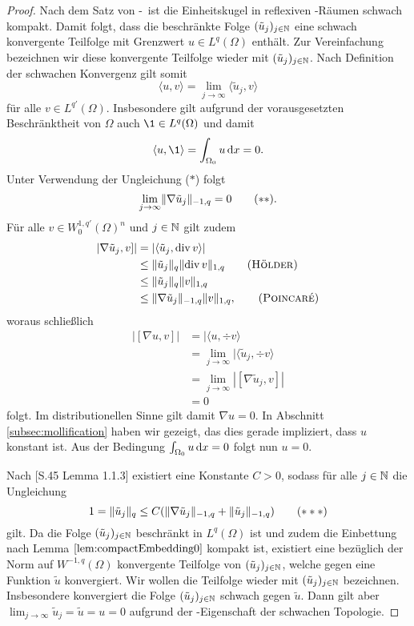 \begin{proof}
  Nach dem Satz von \banach\hyp{}\alaoglu\ ist die Einheitskugel in reflexiven \banach\hyp{}Räumen schwach kompakt.
  Damit folgt, dass die beschränkte Folge $(\tilde u_j)_{j \in \mathbb{N}}$ eine schwach konvergente Teilfolge mit Grenzwert $u \in L^q(\Omega)$ enthält.
  Zur Vereinfachung bezeichnen wir diese konvergente Teilfolge wieder mit $(\tilde u_j)_{j \in \mathbb{N}}$.
  Nach Definition der schwachen Konvergenz gilt somit
  $$
  \langle u, v \rangle = \lim_{j \to \infty} \langle \tilde u_j, v \rangle
  $$
  für alle $v \in L^{q'}(\Omega)$.
  Insbesondere gilt aufgrund der vorausgesetzten Beschränktheit von $\Omega$ auch $\1 \in L^q(\Omega)$ und damit
  $$
  \langle u, \1 \rangle = \int_{\Omega_0} u \d x = 0.
  $$
  Unter Verwendung der Ungleichung ($\ast$) folgt
  \begin{displaymath}
    \lim_{j \to \infty} \lVert \nabla \tilde u_j \rVert_{-1,q} = 0 \tag{$\ast\ast$}.
  \end{displaymath}
  Für alle $v \in W_0^{1,q'}(\Omega)^n$ und $j \in \mathbb{N}$ gilt zudem 
  \begin{align*}
    |\nabla \tilde u_j, v]|
    &= |\langle \tilde u_j, \div v \rangle| \\
    &\leq \norm{\tilde u_j}_q \norm{\div v}_{1,q} \tag{\hoelder}\\
    &\leq \norm{\tilde u_j}_q \norm{v}_{1,q} \\
    &\leq \norm{\nabla \tilde u_j}_{-1,q} \norm{v}_{1,q}, \tag{\poincare}
  \end{align*}
  woraus schließlich
  \begin{align*}
    |[\nabla u, v]|
    &= |\langle u, \div v \rangle \\
    &= \lim_{j \to \infty}|\langle \tilde u_j, \div v \rangle \\
    &= \lim_{j \to \infty} |[\nabla \tilde u_j, v ]| \\
    &= 0
  \end{align*}
  folgt.
  Im distributionellen Sinne gilt damit $\nabla u = 0$.
  In Abschnitt \ref{subsec:mollification} haben wir gezeigt, das dies gerade impliziert, dass $u$ konstant ist.
  Aus der Bedingung $\int_{\Omega_0} u \, {\operatorname{d}\!{x}} = 0$ folgt nun $u = 0$. 
  
  Nach \cite{sohr2001navier}[S.45 Lemma 1.1.3] existiert eine Konstante $C > 0$, sodass für alle $j \in \mathbb{N}$ die Ungleichung
  \begin{displaymath}
    1 = \lVert \tilde u_j \rVert_q \leq C (\lVert \nabla \tilde u_j \rVert_{-1,q} + \lVert \tilde u_j \rVert_{-1,q}) \tag{$\ast\ast\ast$}
  \end{displaymath}
  gilt.
  Da die Folge $(\tilde u_j)_{j \in \mathbb{N}}$ beschränkt in $L^q(\Omega)$ ist und zudem die Einbettung nach Lemma $\ref{lem:compactEmbedding0}$ kompakt ist, existiert eine bezüglich der Norm auf $W^{-1,q}(\Omega)$ konvergente Teilfolge von $(\tilde u_j)_{j \in \mathbb{N}}$, welche gegen eine Funktion $\tilde u$ konvergiert. 
  Wir wollen die Teilfolge wieder mit $(\tilde u_j)_{j \in \mathbb{N}}$ bezeichnen.
  Insbesondere konvergiert die Folge $(\tilde u_j)_{j \in \mathbb{N}}$ schwach gegen $\tilde u$.
  Dann gilt aber $\lim_{j \to \infty} \tilde u_j = \tilde u = u = 0$ aufgrund der \hausdorff\hyp{}Eigenschaft der schwachen Topologie.


\end{proof}
